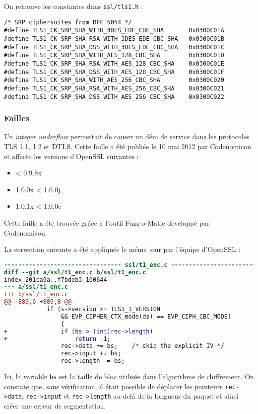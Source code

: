 On retrouve les constantes dans \verb+ssl/tls1.h+ : 
\begin{verbatim}
/* SRP ciphersuites from RFC 5054 */
#define TLS1_CK_SRP_SHA_WITH_3DES_EDE_CBC_SHA       0x0300C01A
#define TLS1_CK_SRP_SHA_RSA_WITH_3DES_EDE_CBC_SHA   0x0300C01B
#define TLS1_CK_SRP_SHA_DSS_WITH_3DES_EDE_CBC_SHA   0x0300C01C
#define TLS1_CK_SRP_SHA_WITH_AES_128_CBC_SHA        0x0300C01D
#define TLS1_CK_SRP_SHA_RSA_WITH_AES_128_CBC_SHA    0x0300C01E
#define TLS1_CK_SRP_SHA_DSS_WITH_AES_128_CBC_SHA    0x0300C01F
#define TLS1_CK_SRP_SHA_WITH_AES_256_CBC_SHA        0x0300C020
#define TLS1_CK_SRP_SHA_RSA_WITH_AES_256_CBC_SHA    0x0300C021
#define TLS1_CK_SRP_SHA_DSS_WITH_AES_256_CBC_SHA    0x0300C022
\end{verbatim}

\subsubsection{Failles}

Un \textit{integer underflow} permettait de causer un déni de service dans les protocoles TLS 1.1, 1.2 et DTLS. Cette faille \cite{CVE20122333} a été publiée le 10 mai 2012 par Codenomicon et affecte les versions d'OpenSSL suivantes :
\begin{itemize}
\item < 0.9.8x
\item 1.0.0x < 1.0.0j
\item 1.0.1x < 1.0.0c
\end{itemize}

Cette faille a été trouvée grâce à l'outil Fuzz-o-Matic développé par Codenomicon.

La correction suivante a été appliquée le même jour par l'équipe d'OpenSSL :
\begin{lstlisting}[language=diff]
--------------------------------- ssl/t1_enc.c --------------------------------
diff --git a/ssl/t1_enc.c b/ssl/t1_enc.c
index 201ca9a..f7bdeb3 100644
--- a/ssl/t1_enc.c
+++ b/ssl/t1_enc.c
@@ -889,6 +889,8 @@
            if (s->version >= TLS1_1_VERSION
                && EVP_CIPHER_CTX_mode(ds) == EVP_CIPH_CBC_MODE)
                {
+               if (bs > (int)rec->length)
+                   return -1;
                rec->data += bs;    /* skip the explicit IV */
                rec->input += bs;
                rec->length -= bs;
\end{lstlisting}

Ici, la variable \verb+bs+ est la taille de bloc utilisée dans l'algorithme de chiffrement.
On constate que, sans vérification, il était possible de déplacer les pointeurs \verb+rec->data+, \verb+rec->input+ et \verb+rec->length+  au-delà de la longueur du paquet et ainsi créer une erreur de segmentation.

